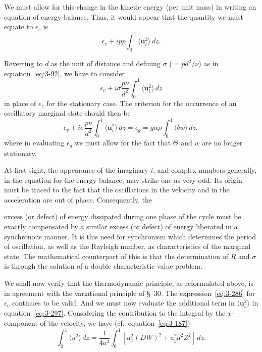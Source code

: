 We must allow for this change in the kinetic energy (per unit mass) in writing an equation of energy balance. Thus, it would appear that the quantity we must equate to $\epsilon_v$ is
\begin{equation}\label{eq:3-295}
\epsilon_v + ipp\int_0^1 \langle\mathbf{u}_i^2\rangle\,dz.
\end{equation}

Reverting to $d$ as the unit of distance and defining $\sigma$ ($= pd^2/\nu$) as in equation~\eqref{eq:3-92}, we have to consider
\begin{equation}\label{eq:3-296}
\epsilon_v + i\sigma\frac{p\nu}{d^2}\int_0^1 \langle\mathbf{u}_i^2\rangle\,dz
\end{equation}
in place of $\epsilon_v$ for the stationary case. The criterion for the occurrence of an oscillatory marginal state should then be
\begin{equation}\label{eq:3-297}
\epsilon_v + i\sigma\frac{p\nu}{d^2}\int_0^1 \langle\mathbf{u}_i^2\rangle\,dz = \epsilon_g = g\alpha\rho\int_0^1 \langle\delta w\rangle\,dz,
\end{equation}
where in evaluating $\epsilon_g$ we must allow for the fact that $\Theta$ and $w$ are no longer stationary.

At first sight, the appearance of the imaginary $i$, and complex numbers generally, in the equation for the energy balance, may strike one as very odd. Its origin must be traced to the fact that the oscillations in the velocity and in the acceleration are out of phase. Consequently, the

\noindent excess (or defect) of energy dissipated during one phase of the cycle must be exactly compensated by a similar excess (or defect) of energy liberated in a synchronous manner. It is this need for synchronism which determines the period of oscillation, as well as the Rayleigh number, as characteristics of the marginal state. The mathematical counterpart of this is that the determination of $R$ and $\sigma$ is through the solution of a double characteristic value problem.

We shall now verify that the thermodynamic principle, as reformulated above, is in agreement with the variational principle of \S~30. The expression~\eqref{eq:3-286} for $\epsilon_v$ continues to be valid. And we must now evaluate the additional term in $\langle\mathbf{u}_i^2\rangle$ in equation~\eqref{eq:3-297}. Considering the contribution to the integral by the $x$-component of the velocity, we have (cf.\ equation~\eqref{eq:3-187})
\begin{equation}\label{eq:3-298}
\int_0^1 \langle u^2\rangle\,dz = \frac{1}{4a^4}\int_0^1 [a_x^2(DW)^2 + a_y^2 d^2 Z^2]\,dz.
\end{equation}

